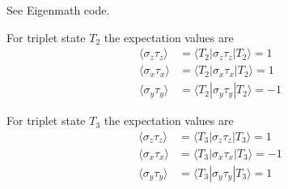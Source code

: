 


\bigskip
See Eigenmath code.

\bigskip
For triplet state $T_2$ the expectation values are
\begin{align*}
\langle\sigma_z\tau_z\rangle&=\langle T_2|\sigma_z\tau_z|T_2\rangle=1
\\[1ex]
\langle\sigma_x\tau_x\rangle&=\langle T_2|\sigma_x\tau_x|T_2\rangle=1
\\[1ex]
\langle\sigma_y\tau_y\rangle&=\langle T_2|\sigma_y\tau_y|T_2\rangle=-1
\end{align*}

For triplet state $T_3$ the expectation values are
\begin{align*}
\langle\sigma_z\tau_z\rangle&=\langle T_3|\sigma_z\tau_z|T_3\rangle=1
\\[1ex]
\langle\sigma_x\tau_x\rangle&=\langle T_3|\sigma_x\tau_x|T_3\rangle=-1
\\[1ex]
\langle\sigma_y\tau_y\rangle&=\langle T_3|\sigma_y\tau_y|T_3\rangle=1
\end{align*}


